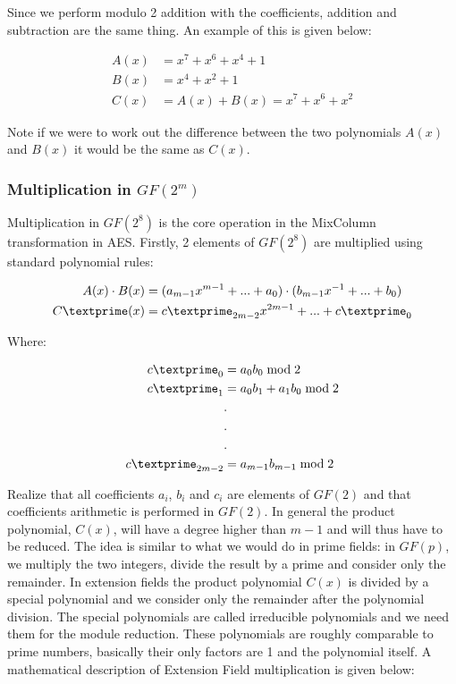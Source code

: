 Since we perform modulo 2 addition with the coefficients, addition and subtraction are the same thing. An example of this is given below:

\begin{center}
\begin{align*}
A(x) &= x^7 + x^6 + x^4  + 1 \\
B(x) &= x^4 + x^2 + 1 \\
C(x) &= A(x) + B(x) = x^7 + x^6 + x^2
\end{align*}
\end{center}

Note if we were to work out the difference between the two polynomials $A(x)$ and $B(x)$ it would be the same as $C(x)$.

\subsubsection{Multiplication in $GF(2^m)$}

Multiplication in $GF(2^8)$ is the core operation in the MixColumn transformation in AES. Firstly, 2 elements of $GF(2^8)$ are multiplied using standard polynomial rules:

\begin{center}
\begin{align*}
A(x) \cdot B(x) &= (a_{m-1}x^{m-1} + ... + a_0) \cdot (b_{m-1}x^{-1} + ... + b_0) \\
C\textprime(x) &= c\textprime_{2m-2}x^{2m-1} + ... + c\textprime_0
\end{align*}

Where:

\begin{align*}
c\textprime_0 &= a_0b_0 \bmod 2 \\
c\textprime_1 &= a_0b_1 + a_1b_0 \bmod 2 \\
&. \\
&. \\
&. \\
c\textprime_{2m-2} &= a_{m-1}b_{m-1} \bmod 2
\end{align*}

\end{center}

Realize that all coefficients $a_i$, $b_i$ and $c_i$ are elements of $GF(2)$ and that coefficients arithmetic is performed in $GF(2)$. In general the product polynomial, $C(x)$, will have a degree higher than $m-1$ and will thus have to be reduced. The idea is similar to what we would do in prime fields: in $GF(p)$, we multiply  the two integers, divide the result by a prime and consider only the remainder. In extension fields the product polynomial $C(x)$ is divided by a special polynomial and we consider only the remainder after the polynomial division. The special polynomials are called irreducible polynomials and we need them for the module reduction. These polynomials are roughly comparable to prime numbers, basically their only factors are 1 and the polynomial itself. A mathematical description of Extension Field multiplication is given below:

